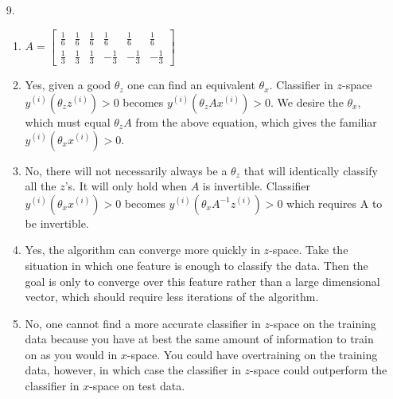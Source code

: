 \documentclass{article}
\begin{document}
\begin{enumerate}
\item[9.]
	\begin{enumerate}
	\item
		  $A = \left[ \begin{smallmatrix} 
		       \frac{1}{6} & \frac{1}{6} & \frac{1}{6} & \frac{1}{6} & \frac{1}{6} & \frac{1}{6}\\
		       \frac{1}{3} & \frac{1}{3} & \frac{1}{3} &-\frac{1}{3} &-\frac{1}{3} &-\frac{1}{3} \end{smallmatrix} \right]$
	\item 
		  Yes, given a good $\theta_z$ one can find an equivalent $\theta_x$.
		  \newline\newline
		  Classifier in $z$-space $y^{(i)}\left(\theta_z z^{(i)}\right) > 0$ becomes $y^{(i)}\left(\theta_z A x^{(i)}\right) > 0$.
		  \newline\newline
		  We desire the $\theta_x$, which must equal $\theta_z A$ from the above equation, which gives the familiar $y^{(i)}\left(\theta_x x^{(i)}\right) > 0$.
	\item 
		  No, there will not necessarily always be a $\theta_z$ that will identically classify all the $z$'s. It will only hold when $A$ is invertible.
		  \newline\newline
		  Classifier $y^{(i)}\left(\theta_x x^{(i)}\right) > 0$ becomes $y^{(i)}\left(\theta_x A^{-1} z^{(i)}\right) > 0$ which requires A to be invertible. 
	\item 
		  Yes, the algorithm can converge more quickly in $z$-space. Take the situation in which one feature is enough to classify the data. Then the goal is only to converge over this feature rather than a large dimensional vector, which should require less iterations of the algorithm.
	\item 
		  No, one cannot find a more accurate classifier in $z$-space on the training data because you have at best the same amount of information to train on as you would in $x$-space. You could have overtraining on the training data, however, in which case the classifier in $z$-space could outperform the classifier in $x$-space on test data.
	\end{enumerate}

\bigskip


\end{enumerate}
\end{document}
